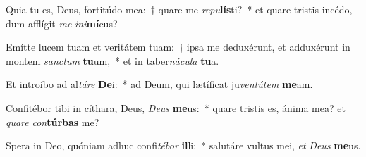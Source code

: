 \item Quia tu es, Deus, fortitúdo mea:~† quare me \textit{re}\textit{pu}\textbf{lís}ti?~* et quare tristis incédo, dum afflígit \textit{me} \textit{in}\textit{i}\textbf{mí}cus?
\item Emítte lucem tuam et veritátem tuam:~† ipsa me deduxérunt, et adduxérunt in montem \textit{sanc}\textit{tum} \textbf{tu}um,~* et in taber\textit{ná}\textit{cu}\textit{la} \textbf{tu}a.
\item Et introíbo ad al\textit{tá}\textit{re} \textbf{De}i:~* ad Deum, qui lætíficat ju\textit{ven}\textit{tú}\textit{tem} \textbf{me}am.
\item Confitébor tibi in cíthara, Deus, \textit{De}\textit{us} \textbf{me}us:~* quare tristis es, ánima mea? et \textit{qua}\textit{re} \textit{con}\textbf{túr}\textbf{bas} me?
\item Spera in Deo, quóniam adhuc confi\textit{té}\textit{bor} \textbf{il}li:~* salutáre vultus mei, \textit{et} \textit{De}\textit{us} \textbf{me}us.
